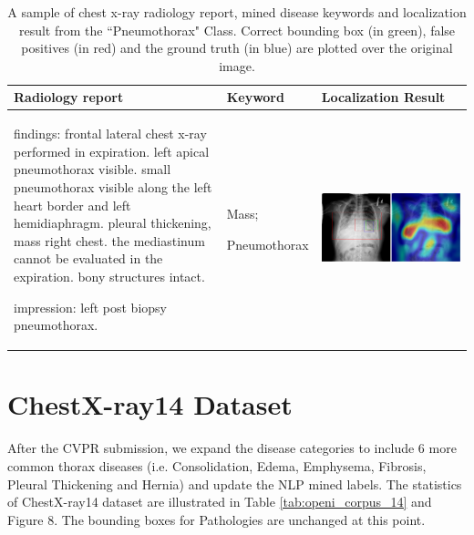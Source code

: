 \documentclass[10pt,twocolumn,letterpaper]{article}
\begin{document}
\begin{table}
	\begin{center}
		\begin{tabular}{p{15em}|p{6em}|p{23em}}
			\hline
			Radiology report & Keyword & Localization Result\\
			\hline\hline
			findings: frontal lateral chest x-ray performed in expiration. left
			apical pneumothorax visible. small pneumothorax visible along the
			left heart border and left hemidiaphragm.
			pleural thickening, mass right chest. the mediastinum cannot be
			evaluated in the expiration. bony structures intact.
			
			impression: left post biopsy pneumothorax.
			& Mass;
			
			Pneumothorax
			&\vspace{0cm}\includegraphics[width=1\linewidth]{00015264_01_c_8.png} \\
			\hline
		\end{tabular}
	\end{center}
	\caption{A sample of chest x-ray radiology report, mined disease keywords and localization result from the ``Pneumothorax" Class. Correct bounding box (in green), false positives (in red) and the ground truth (in blue) are plotted over the original image.}
	\label{tab:Loc_example_8}
\end{table}

\cleardoublepage

\hspace{1mm}   
\newpage
\hspace{1mm}
\newpage
\section{ChestX-ray14 Dataset}
After the CVPR submission, we expand the disease categories to include 6 more common thorax diseases (i.e. Consolidation, Edema, Emphysema, Fibrosis, Pleural Thickening and Hernia) and update the NLP mined labels. The statistics of ChestX-ray14 dataset are illustrated in Table \ref{tab:openi_corpus_14} and Figure {\color{red} 8}. The bounding boxes for Pathologies are unchanged at this point.
\end{document}
